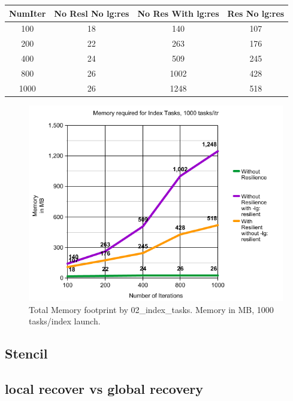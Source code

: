 \begin{center}
 \begin{tabular}{||c | c | c | c||} 
 \hline
 NumIter& No Resl No lg:res & No Res With lg:res & Res No lg:res \\ [0.25ex] 
 \hline\hline
100 &  18 & 140 & 107 \\ 
 \hline
200 &  22 & 263 & 176 \\ 
 \hline
400 &  24 & 509 & 245 \\ 
 \hline
800 &  26 & 1002 & 428\\ 
 \hline
1000 & 26 & 1248 & 518\\ [1ex] 
 \hline
\end{tabular}
\end{center}

\begin{figure}
\includegraphics[width=\textwidth]{images/index_tasks_memory.png}
\caption{Total Memory footprint by 02\_index\_tasks. Memory in MB, 1000 tasks/index launch.}
\end{figure}





\subsection{Stencil}



\subsection{local recover vs global recovery}

